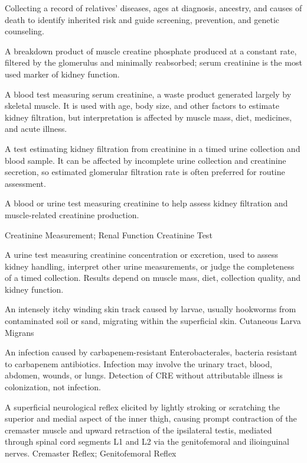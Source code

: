 Collecting a record of relatives’ diseases, ages at diagnosis, ancestry, and causes of death to identify inherited risk and guide screening, prevention, and genetic counseling.

 A breakdown product of muscle creatine phosphate produced at a constant rate, filtered
by the glomerulus and minimally reabsorbed; serum creatinine is the most used marker of
kidney function.

 A blood test measuring serum creatinine, a waste product generated largely by skeletal muscle. It is used with age, body size, and other factors to estimate kidney filtration, but interpretation is affected by muscle mass, diet, medicines, and acute illness.

 A test estimating kidney filtration from creatinine in a timed urine collection and blood sample. It can be affected by incomplete urine collection and creatinine secretion, so estimated glomerular filtration rate is often preferred for routine assessment.

 A blood or urine test measuring creatinine to help assess kidney filtration and muscle-related creatinine production.

\synonyms
Creatinine Measurement; Renal Function Creatinine Test

 A urine test measuring creatinine concentration or excretion, used to assess kidney handling, interpret other urine measurements, or judge the completeness of a timed collection. Results depend on muscle mass, diet, collection quality, and kidney function.

 An intensely itchy winding skin track caused by larvae, usually hookworms from contaminated soil or sand, migrating within the superficial skin.
\synonyms
Cutaneous Larva Migrans

 An infection caused by carbapenem-resistant
Enterobacterales, bacteria resistant to carbapenem antibiotics. Infection may
involve the urinary tract, blood, abdomen, wounds, or lungs. Detection of CRE
without attributable illness is colonization, not infection.

 A superficial neurological reflex elicited by lightly stroking or scratching the superior and medial aspect of the inner thigh, causing prompt contraction of the cremaster muscle and upward retraction of the ipsilateral testis, mediated through spinal cord segments L1 and L2 via the genitofemoral and ilioinguinal nerves.
\synonyms
Cremaster Reflex; Genitofemoral Reflex

